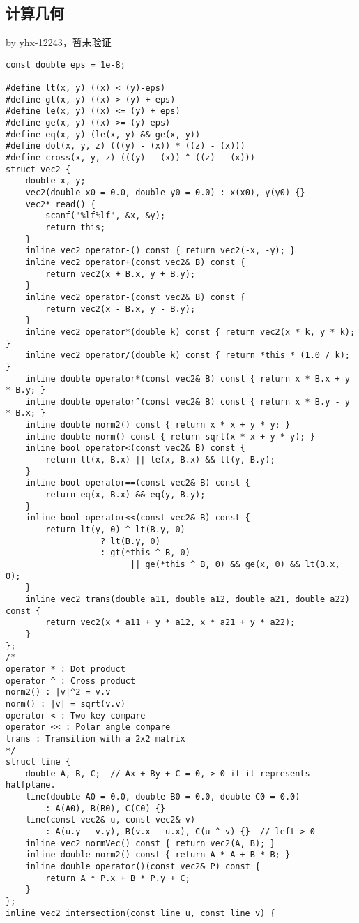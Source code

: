 \documentclass[twoside]{article}
\begin{document}
\subsection{计算几何}
by yhx-12243，暂未验证
\begin{lstlisting}
const double eps = 1e-8;

#define lt(x, y) ((x) < (y)-eps)
#define gt(x, y) ((x) > (y) + eps)
#define le(x, y) ((x) <= (y) + eps)
#define ge(x, y) ((x) >= (y)-eps)
#define eq(x, y) (le(x, y) && ge(x, y))
#define dot(x, y, z) (((y) - (x)) * ((z) - (x)))
#define cross(x, y, z) (((y) - (x)) ^ ((z) - (x)))
struct vec2 {
	double x, y;
	vec2(double x0 = 0.0, double y0 = 0.0) : x(x0), y(y0) {}
	vec2* read() {
		scanf("%lf%lf", &x, &y);
		return this;
	}
	inline vec2 operator-() const { return vec2(-x, -y); }
	inline vec2 operator+(const vec2& B) const {
		return vec2(x + B.x, y + B.y);
	}
	inline vec2 operator-(const vec2& B) const {
		return vec2(x - B.x, y - B.y);
	}
	inline vec2 operator*(double k) const { return vec2(x * k, y * k); }
	inline vec2 operator/(double k) const { return *this * (1.0 / k); }
	inline double operator*(const vec2& B) const { return x * B.x + y * B.y; }
	inline double operator^(const vec2& B) const { return x * B.y - y * B.x; }
	inline double norm2() const { return x * x + y * y; }
	inline double norm() const { return sqrt(x * x + y * y); }
	inline bool operator<(const vec2& B) const {
		return lt(x, B.x) || le(x, B.x) && lt(y, B.y);
	}
	inline bool operator==(const vec2& B) const {
		return eq(x, B.x) && eq(y, B.y);
	}
	inline bool operator<<(const vec2& B) const {
		return lt(y, 0) ^ lt(B.y, 0)
		           ? lt(B.y, 0)
		           : gt(*this ^ B, 0)
		                 || ge(*this ^ B, 0) && ge(x, 0) && lt(B.x, 0);
	}
	inline vec2 trans(double a11, double a12, double a21, double a22) const {
		return vec2(x * a11 + y * a12, x * a21 + y * a22);
	}
};
/*
operator * : Dot product
operator ^ : Cross product
norm2() : |v|^2 = v.v
norm() : |v| = sqrt(v.v)
operator < : Two-key compare
operator << : Polar angle compare
trans : Transition with a 2x2 matrix
*/
struct line {
	double A, B, C;  // Ax + By + C = 0, > 0 if it represents halfplane.
	line(double A0 = 0.0, double B0 = 0.0, double C0 = 0.0)
	    : A(A0), B(B0), C(C0) {}
	line(const vec2& u, const vec2& v)
	    : A(u.y - v.y), B(v.x - u.x), C(u ^ v) {}  // left > 0
	inline vec2 normVec() const { return vec2(A, B); }
	inline double norm2() const { return A * A + B * B; }
	inline double operator()(const vec2& P) const {
		return A * P.x + B * P.y + C;
	}
};
inline vec2 intersection(const line u, const line v) {

\end{lstlisting}
\end{document}
